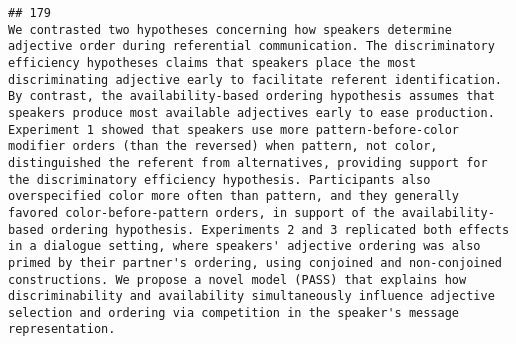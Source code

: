 \documentclass[
  english,
  man]{apa6}
\begin{document}
\begin{verbatim}
## 179                                                                                                                                                                                                                                                                                                                                                                                                                                                                                                                                                                                                                                                                                                                                                                                                                                                                                                                                                                                                                                                                                                                                                                                                                                                                                                                                                                                                                     We contrasted two hypotheses concerning how speakers determine adjective order during referential communication. The discriminatory efficiency hypotheses claims that speakers place the most discriminating adjective early to facilitate referent identification. By contrast, the availability-based ordering hypothesis assumes that speakers produce most available adjectives early to ease production. Experiment 1 showed that speakers use more pattern-before-color modifier orders (than the reversed) when pattern, not color, distinguished the referent from alternatives, providing support for the discriminatory efficiency hypothesis. Participants also overspecified color more often than pattern, and they generally favored color-before-pattern orders, in support of the availability-based ordering hypothesis. Experiments 2 and 3 replicated both effects in a dialogue setting, where speakers' adjective ordering was also primed by their partner's ordering, using conjoined and non-conjoined constructions. We propose a novel model (PASS) that explains how discriminability and availability simultaneously influence adjective selection and ordering via competition in the speaker's message representation.

\end{verbatim}
\end{document}
